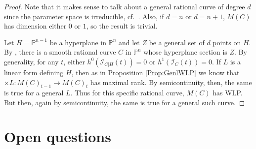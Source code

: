 \documentclass[12pt]{amsart}%
\numberwithin{equation}{section}
\theoremstyle{definition}
\numberwithin{equation}{section}
\newcommand{\PP}{ \ensuremath{\mathbb{P}}}
\begin{document}
\begin{proof}
    Note that it makes sense to talk about a general rational curve of degree $d$ since the parameter space is irreducible, {cf.\ \cite[Section 0.4]{Fulton}}. Also, if $d=n$ or $d=n+1$, $M(C)$ has dimension either $0$ or $1$, so the result is trivial.

    Let $H = \PP^{n-1}$ be a hyperplane in $\PP^n$ and let $Z$ be a general set of $d$ points on $H$. By \cite[Theorem 1.6]{BM}, there is a smooth rational curve $C$ in $\PP^n$ whose hyperplane section is $Z$. By generality, for any $t$, either $h^0(\mathcal I_{C|H}(t)) = 0$ or $h^1(\mathcal I_C(t)) = 0$. If $L$ is a linear form defining $H$, then as in Proposition \ref{Prop:GenlWLP} we know that $\times L \colon M(C)_{t-1} \rightarrow M(C)_t$ has maximal rank. By semicontinuity, then, the same is true for a general $L$. Thus for this specific rational curve, $M(C)$ has WLP. But then, again by semicontinuity, the same is true for a general such curve.
\end{proof}

   
   




    



\section{Open questions}
\end{document}
